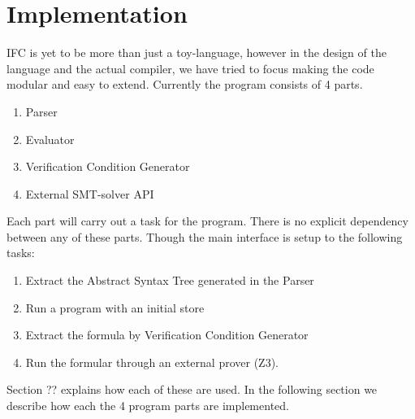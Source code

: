 \section{Implementation}
IFC is yet to be more than just a toy-language, however in the design of the language and the actual compiler, we have tried to focus making the code modular and easy to extend.
Currently the program consists of 4 parts.
\begin{enumerate}
  \item Parser
  \item Evaluator
  \item Verification Condition Generator
  \item External SMT-solver API
\end{enumerate}
Each part will carry out a task for the program. There is no explicit dependency between any of these parts. Though the main interface is setup to the following tasks:
\begin{enumerate}
  \item Extract the Abstract Syntax Tree generated in the Parser
  \item Run a program with an initial store
  \item Extract the formula by Verification Condition Generator
  \item Run the formular through an external prover (Z3).
\end{enumerate}
Section ?? explains how each of these are used. In the following section we describe how each the 4 program parts are implemented.








